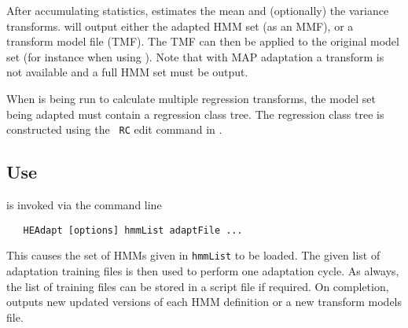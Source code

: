 After accumulating statistics,  estimates the mean and
(optionally) the variance transforms.   will output
either the adapted HMM set (as an MMF), or a transform model file
(TMF). The TMF can then be applied to the original model set (for
instance when using ). Note that with MAP adaptation a
transform is not available and a full HMM set must be output.

When  is being run to calculate multiple regression
transforms, the model set being adapted must contain a regression
class tree. The regression class tree is constructed using the {\tt
RC} edit command in .

\subsection{Use}{}

 is invoked via the command line
\begin{verbatim}
   HEAdapt [options] hmmList adaptFile ...
\end{verbatim}
This causes the set of HMMs given in {\tt hmmList} to be loaded.
The given list of
adaptation training files is then used to perform one adaptation
cycle. As always, the list of training files can be stored in a script
file  if required.  On completion,  outputs new updated 
versions of each HMM definition or a new transform models file.

